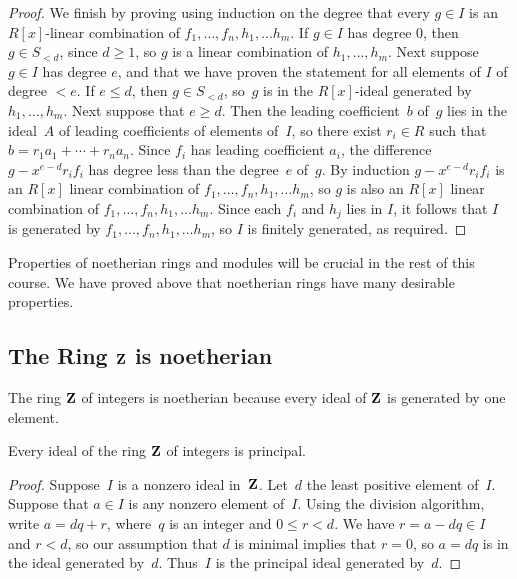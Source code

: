 \begin{proof}
We finish by proving using induction on the degree that every $g\in I$ is an
$R[x]$-linear combination of $f_1,\ldots, f_n, h_1,\ldots h_m$.
If $g\in I$ has degree $0$, then $g \in S_{<d}$, since $d\geq 1$, so
$g$ is a linear combination of $h_1,\ldots, h_m$.  Next suppose
$g\in I$ has degree $e$, and that we have proven the statement
for all elements of $I$ of degree $<e$.
If $e\leq d$, then $g\in S_{<d}$, so~$g$ is
in the $R[x]$-ideal generated by $h_1,\ldots, h_m$.  Next suppose
that $e\geq d$.  Then the leading coefficient~$b$
of~$g$ lies in the ideal~$A$ of leading coefficients of elements of~$I$, so there
exist $r_i\in R$ such that $b=r_1 a_1 + \cdots + r_n a_n$.  Since
$f_i$ has leading coefficient $a_i$, the difference $g- x^{e-d} r_i
f_i$ has degree less than the degree~$e$ of~$g$.  By induction $g-
x^{e-d} r_i f_i$ is an $R[x]$ linear combination of $f_1,\ldots, f_n,
h_1,\ldots h_m$, so $g$ is also an $R[x]$ linear combination of
$f_1,\ldots, f_n, h_1,\ldots h_m$.  Since each $f_i$ and $h_j$ lies in
$I$, it follows that $I$ is generated by $f_1,\ldots, f_n, h_1,\ldots
h_m$, so $I$ is finitely generated, as required.
\end{proof}

Properties of noetherian rings and modules will be crucial in the rest
of this course.  We have proved above that noetherian rings have many
desirable properties.

\subsection{The Ring $\mathbf{Z}$ is noetherian}
The ring $\mathbf{Z}$ of integers is noetherian because every ideal of $\mathbf{Z}$ is
generated by one element. 
\begin{proposition}\label{prop:zpid}
Every ideal of the ring $\mathbf{Z}$ of integers is principal.
\end{proposition}
\begin{proof}
Suppose~$I$ is a nonzero ideal in~$\mathbf{Z}$.  Let~$d$ the least positive
element of~$I$.  Suppose that $a\in I$ is any nonzero element of~$I$.
Using the division algorithm, write  $a=dq + r$, where~$q$ is an integer
and $0\leq r < d$.  We have $r=a-dq\in I$ and $r<d$, so our assumption
that $d$ is minimal implies that $r=0$, so $a=dq$ is in the ideal generated
by~$d$.   Thus~$I$ is the principal ideal generated by~$d$.
\end{proof}

